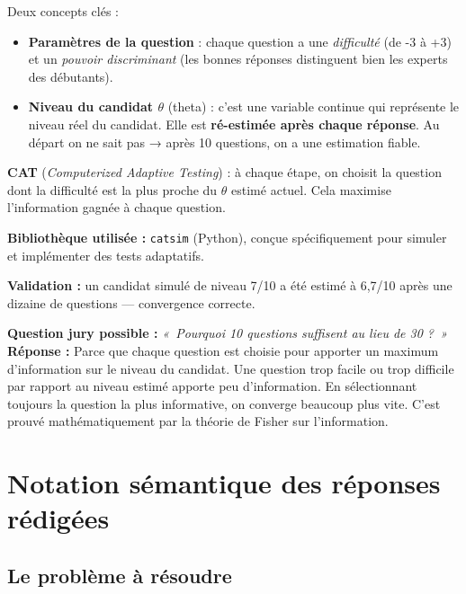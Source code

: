 \documentclass[12pt,a4paper]{article}
\newenvironment{jury}{%
  \def\FrameCommand{\fboxsep=8pt\colorbox{orange!12}}%
  \MakeFramed{\advance\hsize-\width \FrameRestore}%
  \vspace{-4pt}%
}{\endMakeFramed}
\newcommand{\tech}[1]{\texttt{#1}}
\begin{document}
Deux concepts clés :
\begin{itemize}
  \item \textbf{Paramètres de la question} : chaque question a une \textit{difficulté} (de -3 à +3) et un \textit{pouvoir discriminant} (les bonnes réponses distinguent bien les experts des débutants).
  \item \textbf{Niveau du candidat $\theta$} (theta) : c'est une variable continue qui représente le niveau réel du candidat. Elle est \textbf{ré-estimée après chaque réponse}. Au départ on ne sait pas → après 10 questions, on a une estimation fiable.
\end{itemize}

\textbf{CAT} (\textit{Computerized Adaptive Testing}) : à chaque étape, on choisit la question dont la difficulté est la plus proche du $\theta$ estimé actuel. Cela maximise l'information gagnée à chaque question.

\textbf{Bibliothèque utilisée :} \tech{catsim} (Python), conçue spécifiquement pour simuler et implémenter des tests adaptatifs.

\textbf{Validation :} un candidat simulé de niveau 7/10 a été estimé à 6,7/10 après une dizaine de questions — convergence correcte.

\begin{jury}
\textbf{Question jury possible :} \textit{«~Pourquoi 10 questions suffisent au lieu de 30 ?~»}\\[4pt]
\textbf{Réponse :} Parce que chaque question est choisie pour apporter un maximum d'information sur le niveau du candidat. Une question trop facile ou trop difficile par rapport au niveau estimé apporte peu d'information. En sélectionnant toujours la question la plus informative, on converge beaucoup plus vite. C'est prouvé mathématiquement par la théorie de Fisher sur l'information.
\end{jury}

\newpage

\section{Notation sémantique des réponses rédigées}

\subsection{Le problème à résoudre}
\end{document}
